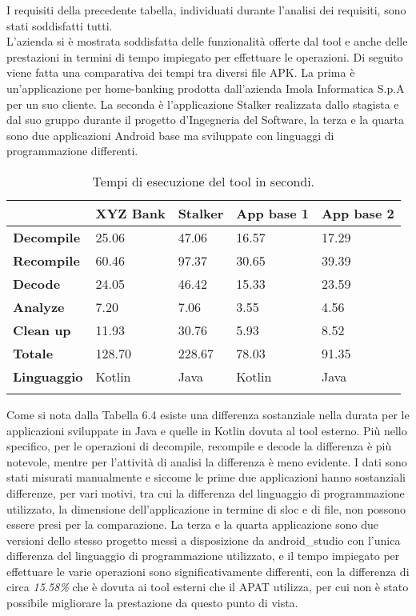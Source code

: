 I requisiti della precedente tabella, individuati durante l'analisi dei requisiti, sono stati soddisfatti tutti.\\
L'azienda si è mostrata soddisfatta delle funzionalità offerte dal tool e anche delle prestazioni in termini di tempo impiegato per effettuare le operazioni.
Di seguito viene fatta una comparativa dei tempi tra diversi file APK. La prima è un'applicazione
per home-banking prodotta dall'azienda Imola Informatica S.p.A per un suo cliente.
La seconda è l'applicazione Stalker realizzata dallo stagista e dal suo gruppo durante il progetto d'Ingegneria del Software, la terza e la quarta sono due applicazioni Android base ma sviluppate con linguaggi di programmazione differenti.

\begin{longtable}{| C{2cm}| C{2cm}| C{2.5cm}| C{2.5cm}| C{2.5cm}|}
    \hline
    & \textbf{XYZ Bank} & \textbf{Stalker} & \textbf{App base 1} & \textbf{App base 2} \\\hline
    \textbf{Decompile}  & 25.06             & 47.06            & 16.57               & 17.29               \\\hline
    \textbf{Recompile}  & 60.46             & 97.37            & 30.65               & 39.39               \\\hline
    \textbf{Decode}     & 24.05             & 46.42            & 15.33               & 23.59               \\\hline
    \textbf{Analyze}    & 7.20              & 7.06             & 3.55                & 4.56                \\\hline
    \textbf{Clean up}   & 11.93             & 30.76            & 5.93                & 8.52                \\\hline
    \textbf{Totale}     & 128.70            & 228.67           & 78.03               & 91.35               \\\hline
    \textbf{Linguaggio} & Kotlin            & Java             & Kotlin              & Java                \\\hline
    \caption{Tempi di esecuzione del tool in secondi.}
\end{longtable}
Come si nota dalla Tabella 6.4 esiste una differenza sostanziale nella durata per
le applicazioni sviluppate in Java e quelle in Kotlin dovuta al
tool esterno.
Più nello specifico, per le operazioni di decompile, recompile e decode la differenza è più notevole, mentre per l'attività di analisi la differenza è meno evidente.
I dati sono stati misurati manualmente e siccome le prime due applicazioni hanno sostanziali differenze, per vari motivi, tra cui la differenza del linguaggio di programmazione utilizzato, la dimensione dell'applicazione in termine di \gls{sloc} e di file, non possono essere presi per la comparazione.
La terza e la quarta applicazione sono due versioni dello stesso progetto messi a disposizione da \gls{android_studio} con
l'unica differenza del linguaggio di programmazione utilizzato, e il tempo impiegato per effettuare le varie operazioni sono significativamente differenti, con la differenza di circa \textit{15.58\%} che è dovuta ai tool esterni che il APAT utilizza, per cui non è stato possibile migliorare la prestazione da questo punto di vista.
